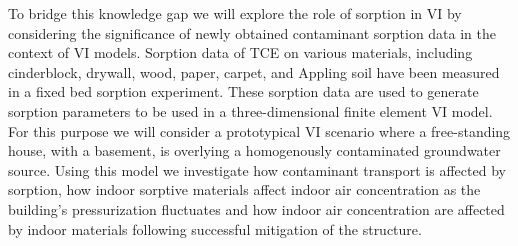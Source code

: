 To bridge this knowledge gap we will explore the role of sorption in VI by considering the significance of newly obtained contaminant sorption data in the context of VI models.
Sorption data of TCE on various materials, including cinderblock, drywall, wood, paper, carpet, and Appling soil have been measured in a fixed bed sorption experiment.
These sorption data are used to generate sorption parameters to be used in a three-dimensional finite element VI model.
For this purpose we will consider a prototypical VI scenario where a free-standing house, with a basement, is overlying a homogenously contaminated groundwater source.
Using this model we investigate how contaminant transport is affected by sorption, how indoor sorptive materials affect indoor air concentration as the building's pressurization fluctuates and how indoor air concentration are affected by indoor materials following successful mitigation of the structure.\par
